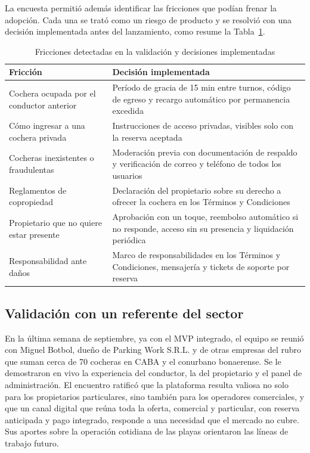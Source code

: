 \documentclass[conference,a4paper]{IEEEtran}
\begin{document}
La encuesta permitió además identificar las fricciones que podían frenar la adopción. Cada una se trató como un riesgo de producto y se resolvió con una decisión implementada antes del lanzamiento, como resume la Tabla~\ref{tab:fricciones}.

\begin{table}[!t]
\centering
\caption{Fricciones detectadas en la validación y decisiones implementadas}
\label{tab:fricciones}
\renewcommand{\arraystretch}{1.2}
\begin{tabular}{>{\raggedright\arraybackslash}p{2.35cm} >{\raggedright\arraybackslash}p{5.3cm}}
\toprule
\textbf{Fricción} & \textbf{Decisión implementada} \\
\midrule
Cochera ocupada por el conductor anterior & Período de gracia de 15 min entre turnos, código de egreso y recargo automático por permanencia excedida \\
\rowcolor{plgray}
Cómo ingresar a una cochera privada & Instrucciones de acceso privadas, visibles solo con la reserva aceptada \\
Cocheras inexistentes o fraudulentas & Moderación previa con documentación de respaldo y verificación de correo y teléfono de todos los usuarios \\
\rowcolor{plgray}
Reglamentos de copropiedad & Declaración del propietario sobre su derecho a ofrecer la cochera en los Términos y Condiciones \\
Propietario que no quiere estar presente & Aprobación con un toque, reembolso automático si no responde, acceso sin su presencia y liquidación periódica \\
\rowcolor{plgray}
Responsabilidad ante daños & Marco de responsabilidades en los Términos y Condiciones, mensajería y tickets de soporte por reserva \\
\bottomrule
\end{tabular}
\end{table}

\subsection{Validación con un referente del sector}

En la última semana de septiembre, ya con el MVP integrado, el equipo se reunió con Miguel Botbol, dueño de Parking Work S.R.L. y de otras empresas del rubro que suman cerca de 70 cocheras en CABA y el conurbano bonaerense. Se le demostraron en vivo la experiencia del conductor, la del propietario y el panel de administración. El encuentro ratificó que la plataforma resulta valiosa no solo para los propietarios particulares, sino también para los operadores comerciales, y que un canal digital que reúna toda la oferta, comercial y particular, con reserva anticipada y pago integrado, responde a una necesidad que el mercado no cubre. Sus aportes sobre la operación cotidiana de las playas orientaron las líneas de trabajo futuro.
\end{document}
